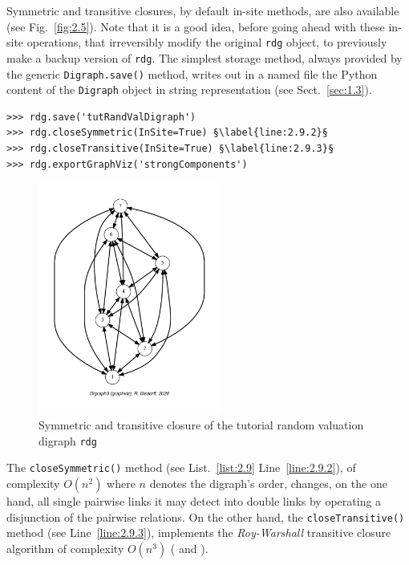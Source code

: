 Symmetric and transitive closures, by default in-site methods, are also available (see Fig.~\vref{fig:2.5}). Note that it is a good idea, before going ahead with these in-site operations, that irreversibly modify the original \texttt{rdg} object, to previously make a backup version of \texttt{rdg}. The simplest storage method, always provided by the generic \texttt{Digraph.save()} method, writes out in a named file the Python content of the \texttt{Digraph} object in string representation (see Sect.~\vref{sec:1.3}).
\begin{lstlisting}[caption={Symmeric and transitive closures},label=list:2.9]
>>> rdg.save('tutRandValDigraph')
>>> rdg.closeSymmetric(InSite=True) §\label{line:2.9.2}§
>>> rdg.closeTransitive(InSite=True) §\label{line:2.9.3}§
>>> rdg.exportGraphViz('strongComponents')
\end{lstlisting}
\begin{figure}[h]
\sidecaption[t]
\includegraphics[width=6cm]{Figures/2-5-strongComponents.pdf}
\caption{Symmetric and transitive closure of the tutorial random valuation digraph \texttt{rdg}}
\label{fig:2.5}       %
\end{figure}

The \texttt{closeSymmetric()} method (see List.~\vref{list:2.9} Line~\ref{line:2.9.2}), of complexity $O(n^2)$ where $n$ denotes the digraph's order, changes, on the one hand, all single pairwise links it may detect into double links by operating a disjunction of the pairwise relations. On the other hand, the \texttt{closeTransitive()}  method (see Line~\ref{line:2.9.3}), implements the \emph{Roy-Warshall} transitive closure algorithm of complexity $O(n^3)$   (\citealp{ROY-1959} and \citealp{WAR-1962}).

